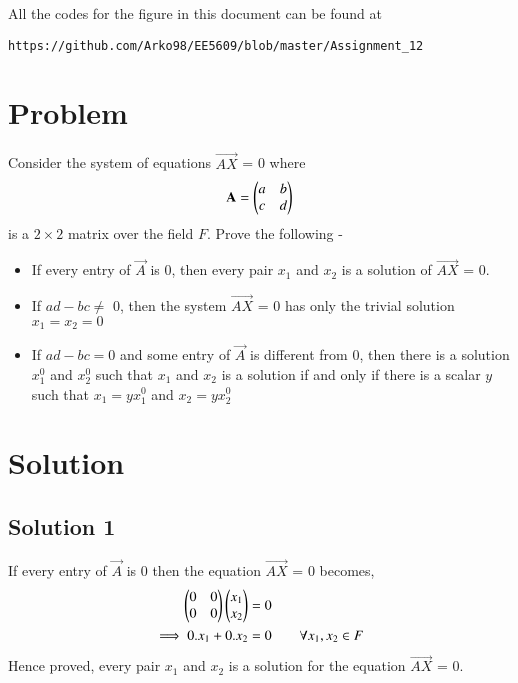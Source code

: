 \documentclass[journal,12pt,twocolumn]{IEEEtran}
\begin{document}
All the codes for the figure in this document can be found at
\begin{lstlisting}
https://github.com/Arko98/EE5609/blob/master/Assignment_12
\end{lstlisting}

\section{\textbf{Problem}}
Consider the system of equations $\vec{AX}$ = 0 where
\begin{align*}
    \mathbf{A} = \begin{pmatrix}a&b\\c&d\end{pmatrix}
\end{align*}
is a $2\times2$ matrix over the field $F$. Prove the following - 
\begin{itemize}
    \item If every entry of $\vec{A}$ is 0, then every pair $x_1$ and $x_2$ is a solution of $\vec{AX}$ = 0.
    \item If $ad - bc \not=$ 0, then the system $\vec{AX}$ = 0 has only the trivial solution $x_1 = x_2 = 0$
    \item If $ad - bc = 0$ and some entry of $\vec{A}$ is different from 0, then there is a solution $x_1^0$ and $x_2^0$ such that $x_1$ and  $x_2$ is a solution if and only if there is a scalar $y$ such that $x_1 = yx_1^0$ and $x_2 = yx_2^0$
\end{itemize}
\section{\textbf{Solution}}
\subsection{Solution 1}
If every entry of $\vec{A}$ is 0 then the equation $\vec{AX}$ = 0 becomes,
\begin{align}
\begin{pmatrix}0&0\\0&0\end{pmatrix}\begin{pmatrix}x_1\\x_2\end{pmatrix} &=0\\
\implies0.x_1+0.x_2 &= 0 \qquad{\text{$\forall x_1,x_2 \in F$}}
\end{align}
Hence proved, every pair $x_1$ and $x_2$ is a solution for the equation $\vec{AX}$ = 0.
\end{document}
